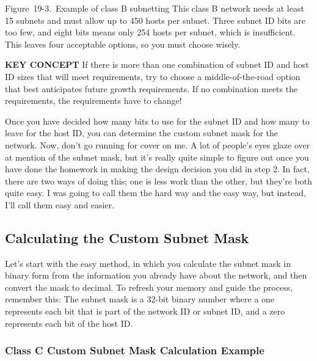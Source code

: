 \documentclass[b5paper,11pt]{memoir}
\begin{document}
\protect\hypertarget{ch19s02.htmlux5cux23example_of_class_b_subnetting_this_class}{}{}

\protect\hypertarget{ch19s02.htmlux5cux23I_mediaobject5_d1e20701}{}{}

Figure~19-3.~Example of class B subnetting This class B network needs at
least 15 subnets and must allow up to 450 hosts per subnet. Three subnet
ID bits are too few, and eight bits means only 254 hosts per subnet,
which is insufficient. This leaves four acceptable options, so you must
choose wisely.


{\textbf{KEY CONCEPT}} If there is more than one combination of subnet
ID and host ID sizes that will meet requirements, try to choose a
middle-of-the-road option that best anticipates future growth
requirements. If no combination meets the requirements, the requirements
have to change!

\protect\hypertarget{ch19s03.html}{}{}

Once you have decided how many bits to use for the subnet ID and how
many to leave for the host ID, you can determine the custom subnet mask
for the network. Now, don't go running for cover on me. A lot of
people's eyes glaze over at mention of the subnet mask, but it's really
quite simple to figure out once you have done the homework in making the
design decision you did in step 2. In fact, there are two ways of doing
this; one is less work than the other, but they're both quite easy. I
was going to call them the hard way and the easy way, but instead, I'll
call them easy and easier.

\subsection[Calculating the Custom Subnet
Mask]{\texorpdfstring{\protect\hypertarget{ch19s03.htmlux5cux23calculating_the_custom_subnet_mask}{}{}Calculating
the Custom Subnet Mask}{Calculating the Custom Subnet Mask}}

Let's start with the easy method, in which you calculate the subnet mask
in binary form from the information you already have about the network,
and then convert the mask to decimal. To refresh your memory and guide
the process, remember this: The subnet mask is a 32-bit binary number
where a one represents each bit that is part of the network ID or subnet
ID, and a zero represents each bit of the host ID.

\subsubsection[class C Custom Subnet Mask Calculation
Example]{\texorpdfstring{\protect\hypertarget{ch19s03.htmlux5cux23class_c_custom_subnet_mask_calculation_e}{}{}Class
C Custom Subnet Mask Calculation
Example}{class C Custom Subnet Mask Calculation Example}}
\end{document}
